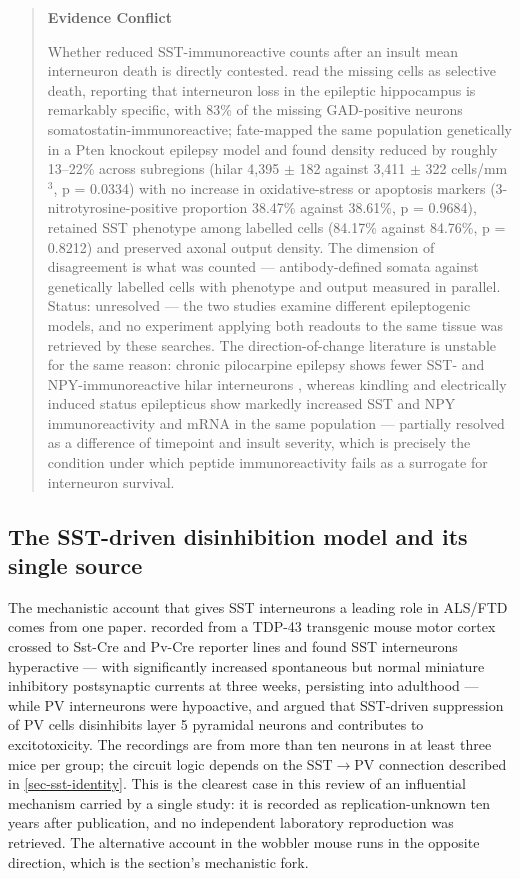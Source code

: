 \documentclass[11pt]{article}
\begin{document}
\begin{quote}
\noindent\textbf{Evidence Conflict}\par
Whether reduced SST-immunoreactive counts after an insult mean interneuron death is directly contested. \citet{Buckmaster1999} read the missing cells as selective death, reporting that interneuron loss in the epileptic hippocampus is remarkably specific, with 83\% of the missing GAD-positive neurons somatostatin-immunoreactive; \citet{Drake2024} fate-mapped the same population genetically in a Pten knockout epilepsy model and found density reduced by roughly 13--22\% across subregions (hilar 4,395 $\pm$ 182 against 3,411 $\pm$ 322 cells/mm$^{3}$, p = 0.0334) with no increase in oxidative-stress or apoptosis markers (3-nitrotyrosine-positive proportion 38.47\% against 38.61\%, p = 0.9684), retained SST phenotype among labelled cells (84.17\% against 84.76\%, p = 0.8212) and preserved axonal output density. The dimension of disagreement is what was counted --- antibody-defined somata against genetically labelled cells with phenotype and output measured in parallel. Status: unresolved --- the two studies examine different epileptogenic models, and no experiment applying both readouts to the same tissue was retrieved by these searches. The direction-of-change literature is unstable for the same reason: chronic pilocarpine epilepsy shows fewer SST- and NPY-immunoreactive hilar interneurons \citep{Long2010}, whereas kindling and electrically induced status epilepticus show markedly increased SST and NPY immunoreactivity and mRNA in the same population \citep{Vezzani1996} --- partially resolved as a difference of timepoint and insult severity, which is precisely the condition under which peptide immunoreactivity fails as a surrogate for interneuron survival.

\end{quote}

\subsection{The SST-driven disinhibition model and its single source}
\label{sec-07-tdp43-model}

The mechanistic account that gives SST interneurons a leading role in ALS/FTD comes from one paper. \citet{Zhang2016} recorded from a TDP-43 transgenic mouse motor cortex crossed to Sst-Cre and Pv-Cre reporter lines and found SST interneurons hyperactive --- with significantly increased spontaneous but normal miniature inhibitory postsynaptic currents at three weeks, persisting into adulthood --- while PV interneurons were hypoactive, and argued that SST-driven suppression of PV cells disinhibits layer 5 pyramidal neurons and contributes to excitotoxicity. The recordings are from more than ten neurons in at least three mice per group; the circuit logic depends on the SST$\rightarrow$PV connection described in \ref{sec-sst-identity}. This is the clearest case in this review of an influential mechanism carried by a single study: it is recorded as replication-unknown ten years after publication, and no independent laboratory reproduction was retrieved. The alternative account in the wobbler mouse runs in the opposite direction, which is the section's mechanistic fork.
\end{document}
